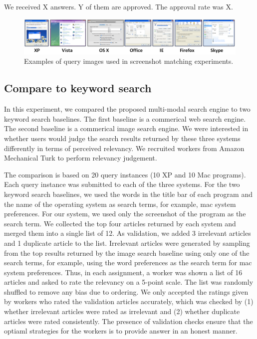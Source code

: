 \documentclass{www2010-submission}
\begin{document}
We received X answers. Y of them are approved. The approval rate
was X.

\begin{figure}
\includegraphics[width=2\columnwidth]{figure/query_examples.png}
\caption{Examples of query images used in screenshot matching
experiments.}
\label{fig:query_examples}
\end{figure}


\subsection{Compare to keyword search}

In this experiment, we compared the proposed multi-modal search engine
to two keyword search baselines. The first baseline is a commerical
web search engine.  The second baseline is a commerical image search
engine. We were interested in whether users would judge the search
results returned by these three systems differently in terms of
perceived relevancy. We recruited workers from Amazon Mechanical Turk
to perform relevancy judgement.

The comparison is based on 20 query instances (10 XP and 10 Mac
programs). Each query instance was submitted to each of the three
systems. For the two keyword search baselines, we used the words in
the title bar of each program and the name of the operating system as
search terms, for example, mac system preferences. For our system, we
used only the screenshot of the program as the search term. We
collected the top four articles returned by each system and merged
them into a single list of 12. As validation, we added 3 irrelevant
articles and 1 duplicate article to the list. Irrelevant articles were
generated by sampling from the top results returned by the image
search baseline using only one of the search terms, for example, using
the word preferences as the search term for mac system
preferences. Thus, in each assignment, a worker was shown a list of 16
articles and asked to rate the relevancy on a 5-point scale. The list
was randomly shuffled to remove any bias due to ordering.  We only
accepted the ratings given by workers who rated the validation
articles accurately, which was checked by (1) whether irrelevant
articles were rated as irrelevant and (2) whether duplicate articles
were rated consistently. The presence of validation checks
ensure that the optiaml strategies for the workers is to
provide answer in an honest manner.
\end{document}
